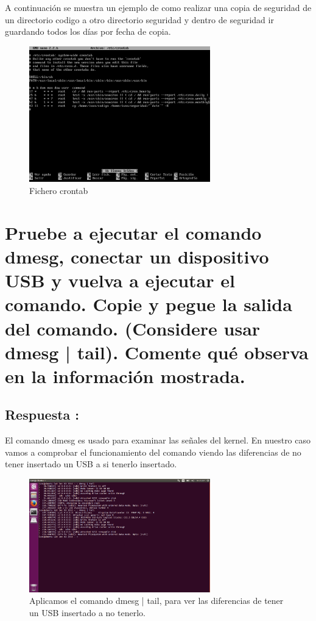 A continuación se muestra un ejemplo de como realizar una copia de seguridad de un directorio codigo a otro directorio seguridad y dentro de seguridad ir guardando todos los días por fecha de copia.

\begin{figure}[H]
	\begin{center}
		\includegraphics[width=0.7\textwidth]{Imagenes/Crontab_copia_seguridad}
		\caption{Fichero crontab} \label{fig:5}
	\end{center}
\end{figure}

\section{Pruebe a ejecutar el comando dmesg, conectar un dispositivo USB y vuelva a ejecutar el comando. Copie y pegue la salida del comando. (Considere usar dmesg | tail). Comente qué observa en la información mostrada.}
\subsection{Respuesta : }
El comando dmesg \cite{DMESG} es usado para examinar las señales del kernel.
En nuestro caso vamos a comprobar el funcionamiento del comando viendo las diferencias de no tener insertado un USB a si tenerlo insertado.

\begin{figure}[H]
	\begin{center}
		\includegraphics[width=0.7\textwidth]{Imagenes/Diferencia_USB_dmesg}
		\caption{Aplicamos el comando dmesg | tail, para ver las diferencias de tener un USB insertado a no tenerlo.} \label{fig:6}
	\end{center}
\end{figure}

